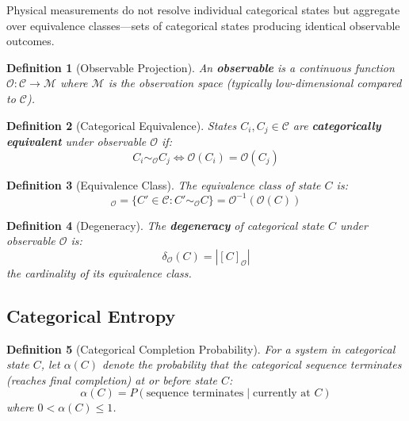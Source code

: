 \documentclass[12pt,a4paper]{article}
\newtheorem{definition}{Definition}
\begin{document}
Physical measurements do not resolve individual categorical states but aggregate over equivalence classes—sets of categorical states producing identical observable outcomes.

\begin{definition}[Observable Projection]
\label{def:observable}
An \textbf{observable} is a continuous function $\mathcal{O}: \mathcal{C} \to \mathcal{M}$ where $\mathcal{M}$ is the observation space (typically low-dimensional compared to $\mathcal{C}$).
\end{definition}

\begin{definition}[Categorical Equivalence]
\label{def:equivalence}
States $C_i, C_j \in \mathcal{C}$ are \textbf{categorically equivalent} under observable $\mathcal{O}$ if:
\begin{equation}
C_i \sim_{\mathcal{O}} C_j \iff \mathcal{O}(C_i) = \mathcal{O}(C_j)
\end{equation}
\end{definition}

\begin{definition}[Equivalence Class]
The equivalence class of state $C$ is:
\begin{equation}
[C]_{\mathcal{O}} = \{C' \in \mathcal{C} : C' \sim_{\mathcal{O}} C\} = \mathcal{O}^{-1}(\mathcal{O}(C))
\end{equation}
\end{definition}

\begin{definition}[Degeneracy]
\label{def:degeneracy}
The \textbf{degeneracy} of categorical state $C$ under observable $\mathcal{O}$ is:
\begin{equation}
\delta_{\mathcal{O}}(C) = |[C]_{\mathcal{O}}|
\end{equation}
the cardinality of its equivalence class.
\end{definition}

\subsection{Categorical Entropy}

\begin{definition}[Categorical Completion Probability]
\label{def:completion_probability}
For a system in categorical state $C$, let $\alpha(C)$ denote the probability that the categorical sequence terminates (reaches final completion) at or before state $C$:
\begin{equation}
\alpha(C) = P(\text{sequence terminates} \mid \text{currently at } C)
\end{equation}
where $0 < \alpha(C) \leq 1$.
\end{definition}
\end{document}
